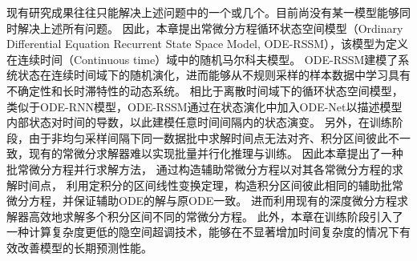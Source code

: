 现有研究成果往往只能解决上述问题中的一个或几个。目前尚没有某一模型能够同时解决上述所有问题。
因此，本章提出常微分方程循环状态空间模型（Ordinary Differential Equation Recurrent State Space Model, ODE-RSSM），该模型为定义在连续时间（Continuous time）域中的随机马尔科夫模型。
ODE-RSSM建模了系统状态在连续时间域下的随机演化，进而能够从不规则采样的样本数据中学习具有不确定性和长时滞特性的动态系统。
相比于离散时间域下的循环状态空间模型，类似于ODE-RNN模型，ODE-RSSM通过在状态演化中加入ODE-Net以描述模型内部状态对时间的导数，以此建模任意时间间隔内的状态演变。
另外，在训练阶段，由于非均匀采样间隔下同一数据批中求解时间点无法对齐、积分区间彼此不一致，现有的常微分求解器难以实现批量并行化推理与训练。
因此本章提出了一种批常微分方程并行求解方法，
通过构造辅助常微分方程以对其各常微分方程的求解时间点，
利用定积分的区间线性变换定理，构造积分区间彼此相同的辅助批常微分方程，并保证辅助ODE的解与原ODE一致。
进而利用现有的深度微分方程求解器高效地求解多个积分区间不同的常微分方程。
此外，本章在训练阶段引入了一种计算复杂度更低的隐空间超调技术，能够在不显著增加时间复杂度的情况下有效改善模型的长期预测性能。


